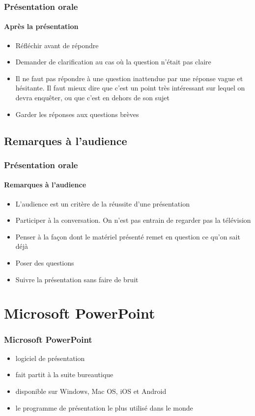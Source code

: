 \documentclass[xcolor=table, usenames,dvipsnames]{beamer}
\begin{document}
\begin{frame}
\frametitle{Présentation orale}
\framesubtitle{Après la présentation}

\begin{itemize}
	\item Réfléchir avant de répondre
	\item Demander de clarification au cas où la question n'était pas claire 
	\item Il ne faut pas répondre à une question inattendue par une réponse vague et hésitante.
	Il faut mieux dire que c'est un point très intéressant sur lequel on devra enquêter, ou que c'est en dehors de son sujet 
	\item Garder les réponses aux questions brèves
\end{itemize}

\end{frame}

\subsection{Remarques à l'audience}

\begin{frame}
\frametitle{Présentation orale}
\framesubtitle{Remarques à l'audience}

\begin{itemize}
	\item L'audience est un critère de la réussite d'une présentation
	\item Participer à la conversation. On n'est pas entrain de regarder pas la télévision
	\item Penser à la façon dont le matériel présenté remet en question ce qu'on sait déjà
	\item Poser des questions
	\item Suivre la présentation sans faire de bruit
\end{itemize}

\end{frame}

\section{Microsoft PowerPoint}

\begin{frame}
\frametitle{Microsoft PowerPoint}
\begin{itemize}
	\item logiciel de présentation
	\item fait partit à la suite bureautique 
	\item disponible sur Windows, Mac OS, iOS et Android
	\item le programme de présentation le plus utilisé dans le monde
\end{itemize}
\end{frame}
\end{document}

